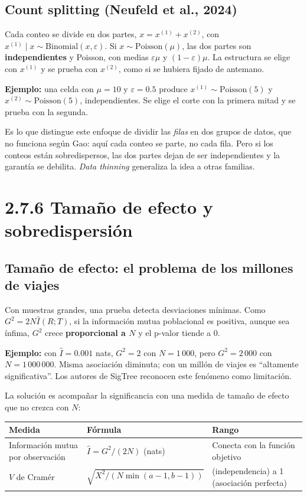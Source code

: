 \documentclass[11pt,a4paper]{article}
\begin{document}
\subsection{Count splitting (Neufeld et al., 2024)}

Cada conteo se divide en dos partes, $x=x^{(1)}+x^{(2)}$, con
$x^{(1)}\mid x\sim\mathrm{Binomial}(x,\varepsilon)$. Si $x\sim\mathrm{Poisson}(\mu)$,
las dos partes son \textbf{independientes} y Poisson, con medias $\varepsilon\mu$ y
$(1-\varepsilon)\mu$. La estructura se elige con $x^{(1)}$ y se prueba con
$x^{(2)}$, como si se hubiera fijado de antemano.

\textbf{Ejemplo:} una celda con $\mu=10$ y $\varepsilon=0.5$ produce
$x^{(1)}\sim\mathrm{Poisson}(5)$ y $x^{(2)}\sim\mathrm{Poisson}(5)$, independientes.
Se elige el corte con la primera mitad y se prueba con la segunda.

Es lo que distingue este enfoque de dividir las \emph{filas} en dos grupos de datos,
que no funciona según Gao: aquí cada conteo se parte, no cada fila. Pero si los
conteos están sobredispersos, las dos partes dejan de ser independientes y la
garantía se debilita. \emph{Data thinning} generaliza la idea a otras familias.

\section{2.7.6 Tamaño de efecto y sobredispersión}

\subsection{Tamaño de efecto: el problema de los millones de viajes}

Con muestras grandes, una prueba detecta desviaciones mínimas. Como
$G^2=2N\hat I(R;T)$, si la información mutua poblacional es positiva, aunque sea
ínfima, $G^2$ crece \textbf{proporcional a $N$} y el p-valor tiende a 0.

\textbf{Ejemplo:} con $\hat I=0.001$ nats, $G^2=2$ con $N=1\,000$, pero
$G^2=2\,000$ con $N=1\,000\,000$. Misma asociación diminuta; con un millón de viajes
es ``altamente significativa''. Los autores de SigTree reconocen este fenómeno como
limitación.

La solución es acompañar la significancia con una medida de tamaño de efecto que no
crezca con $N$:
\begin{center}
\renewcommand{\arraystretch}{1.3}
\begin{tabular}{@{}>{\raggedright\arraybackslash}p{4.4cm}>{\raggedright\arraybackslash}p{5.2cm}>{\raggedright\arraybackslash}p{3.6cm}@{}}
\toprule
\textbf{Medida} & \textbf{Fórmula} & \textbf{Rango} \\
\midrule
Información mutua por observación & $\hat I=G^2/(2N)$ (nats) & Conecta con la función objetivo \\
\midrule
$V$ de Cramér & $\sqrt{X^2/(N\min(a-1,b-1))}$ & 0 (independencia) a 1 (asociación perfecta) \\
\bottomrule
\end{tabular}
\end{center}
\end{document}
